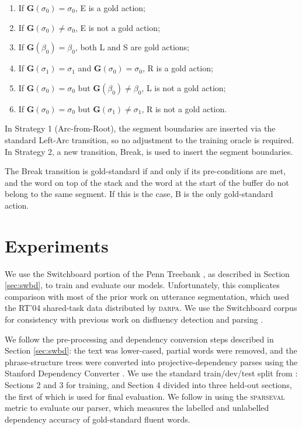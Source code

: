 \documentclass[11pt,letterpaper]{article}
\newcommand{\sparseval}{\textsc{sparseval}\xspace}
\begin{document}
\begin{enumerate}
    \item If $\mathbf{G}(\sigma_0) = \sigma_0$, E is a gold action;
    \item If $\mathbf{G}(\sigma_0) \not= \sigma_0$, E is not a gold action;
    \item If $\mathbf{G}(\beta_0) = \beta_0$, both L and S are gold actions;
    \item If $\mathbf{G}(\sigma_1)= \sigma_1$ and $\mathbf{G}(\sigma_0) = \sigma_0$, R
        is a gold action;
    \item If $\mathbf{G}(\sigma_0) = \sigma_0$ but $\mathbf{G}(\beta_0) \not= \beta_0$,
          L is not a gold action;
      \item If $\mathbf{G}(\sigma_0) = \sigma_0$ but $\mathbf{G}(\sigma_1) \not= \sigma_1$,
          R is not a gold action.
\end{enumerate}

\noindent In Strategy 1 (Arc-from-Root), the segment boundaries are inserted
via the standard Left-Arc transition, so no adjustment to the training oracle
is required.  In Strategy 2, a new transition, Break, is used to insert the
segment boundaries. 

The Break transition is gold-standard if and only if its pre-conditions
are met, and the word on top of the stack and the word at the start of the buffer
do not belong to the same segment.  If this is the case, B is the only gold-standard
action.

\section{Experiments}

We use the Switchboard portion of the Penn Treebank \citep{marcus:93}, as
described in Section \ref{sec:swbd}, to train and evaluate our models.  Unfortunately,
this complicates comparison with most of the prior work on utterance segmentation,
which used the RT'04 shared-task data distributed by \textsc{darpa}.  We use
the Switchboard corpus for consistency with previous work on disfluency 
detection and parsing \citep{qian:13,rasooli:13,honnibal:14}.

We follow the pre-processing and dependency conversion steps described in
Section \ref{sec:swbd}: the text was lower-cased, partial words were removed,
and the phrase-structure trees were converted into projective-dependency parses
using the Stanford Dependency Converter \citep{stanford_deps}.
We use the standard train/dev/test split from \citet{Charniak01a}: Sections 2
and 3 for training, and Section 4 divided into three held-out sections, the first
of which is used for final evaluation.
We follow \citet{honnibal:14} in using the \sparseval \citep{sparseval}
metric to evaluate our parser, which measures the labelled and unlabelled dependency
accuracy of gold-standard fluent words.
\end{document}
